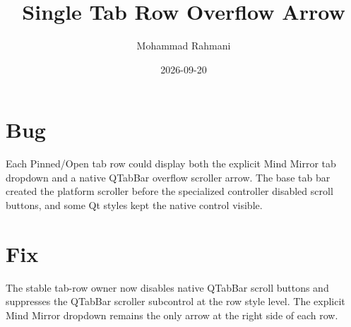 \documentclass[a4paper]{article}
\title{Single Tab Row Overflow Arrow}
\date{2026-09-20}
\author{Mohammad Rahmani}
\begin{document}
   \maketitle

   \begin{preview}
      \section{Bug}
      Each Pinned/Open tab row could display both the explicit Mind Mirror tab
      dropdown and a native QTabBar overflow scroller arrow. The base tab bar
      created the platform scroller before the specialized controller disabled
      scroll buttons, and some Qt styles kept the native control visible.

      \section{Fix}
      The stable tab-row owner now disables native QTabBar scroll buttons and
      suppresses the QTabBar scroller subcontrol at the row style level. The
      explicit Mind Mirror dropdown remains the only arrow at the right side of
      each row.
   \end{preview}

   
   
\end{document}
